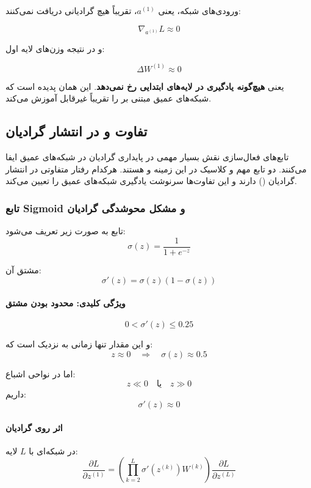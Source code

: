 \documentclass{article}
\begin{document}
ورودی‌های شبکه، یعنی $a^{(1)}$، تقریباً هیچ گرادیانی دریافت نمی‌کنند:

\[
\nabla_{a^{(1)}} L \approx 0
\]

و در نتیجه وزن‌های لایه اول:

\[
\Delta W^{(1)} \approx 0
\]

یعنی \textbf{هیچ‌گونه یادگیری در لایه‌های ابتدایی رخ نمی‌دهد}.  
این همان پدیده  است که شبکه‌های عمیق مبتنی بر  را تقریباً غیرقابل‌ آموزش می‌کند.


\subsection{تفاوت  و  در انتشار گرادیان}

تابع‌های فعال‌سازی نقش بسیار مهمی در پایداری گرادیان در شبکه‌های عمیق ایفا می‌کنند. دو تابع مهم و کلاسیک در این زمینه  و  هستند. هرکدام رفتار متفاوتی در انتشار گرادیان () دارند و این تفاوت‌ها سرنوشت یادگیری شبکه‌های عمیق را تعیین می‌کند.

\subsubsection*{تابع Sigmoid و مشکل محوشدگی گرادیان}

تابع  به صورت زیر تعریف می‌شود:
\[
\sigma(z) = \frac{1}{1 + e^{-z}}
\]

مشتق آن:
\[
\sigma'(z) = \sigma(z)(1 - \sigma(z))
\]

\paragraph{ویژگی کلیدی: محدود بودن مشتق}
\[
0 < \sigma'(z) \le 0.25
\]

و این مقدار تنها زمانی به  نزدیک است که:
\[
z \approx 0 \quad \Rightarrow \quad \sigma(z) \approx 0.5
\]

اما در نواحی اشباع:
\[
z \ll 0 \quad\text{یا}\quad z \gg 0
\]
داریم:
\[
\sigma'(z) \approx 0
\]

\paragraph{اثر روی گرادیان}

در شبکه‌ای با $L$ لایه:
\[
\frac{\partial L}{\partial z^{(1)}} 
= 
\left(\prod_{k=2}^{L} \sigma'(z^{(k)}) W^{(k)}\right)
\frac{\partial L}{\partial z^{(L)}}
\]
\end{document}
